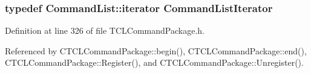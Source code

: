 \subsubsection{\setlength{\rightskip}{0pt plus 5cm}typedef Command\-List::iterator Command\-List\-Iterator}\label{TCLCommandPackage_8h_a1}




Definition at line 326 of file TCLCommand\-Package.h.

Referenced by CTCLCommand\-Package::begin(), CTCLCommand\-Package::end(), CTCLCommand\-Package::Register(), and CTCLCommand\-Package::Unregister().